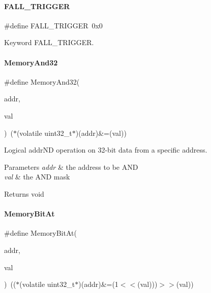\paragraph{\texorpdfstring{F\+A\+L\+L\+\_\+\+T\+R\+I\+G\+G\+ER}{FALL\_TRIGGER}}
{\footnotesize\ttfamily \#define F\+A\+L\+L\+\_\+\+T\+R\+I\+G\+G\+ER~0x0}

Keyword F\+A\+L\+L\+\_\+\+T\+R\+I\+G\+G\+ER. \mbox{\label{a00020_ad87cedffcaadc51db22594fce55173d4}} 
\paragraph{\texorpdfstring{Memory\+And32}{MemoryAnd32}}
{\footnotesize\ttfamily \#define Memory\+And32(\begin{DoxyParamCaption}\item[{}]{addr,  }\item[{}]{val }\end{DoxyParamCaption})~($\ast$(volatile uint32\+\_\+t$\ast$)(addr)\&=(val))}



Logical addr\+ND operation on 32-\/bit data from a specific address. 


\begin{DoxyParams}{Parameters}
{\em addr} & the address to be A\+ND \\
\hline
{\em val} & the A\+ND mask \\
\hline
\end{DoxyParams}
\begin{DoxyReturn}{Returns}
void 
\end{DoxyReturn}
\mbox{\label{a00020_afc530c7e6b49b0ca97c1ad9dac1c4750}} 
\paragraph{\texorpdfstring{Memory\+Bit\+At}{MemoryBitAt}}
{\footnotesize\ttfamily \#define Memory\+Bit\+At(\begin{DoxyParamCaption}\item[{}]{addr,  }\item[{}]{val }\end{DoxyParamCaption})~(($\ast$(volatile uint32\+\_\+t$\ast$)(addr)\&=(1$<$$<$(val)))$>$$>$(val))}



